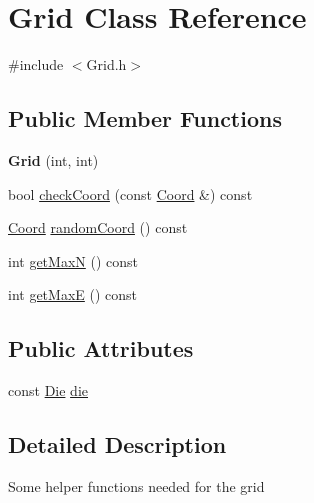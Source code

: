 \hypertarget{classGrid}{
\section{Grid Class Reference}
\label{classGrid}
}


{\ttfamily \#include $<$Grid.h$>$}

\subsection*{Public Member Functions}
\begin{DoxyCompactItemize}
\item 
\hypertarget{classGrid_a2a809d16ae2ba160bd3a0e7a8f6406df}{
{\bfseries Grid} (int, int)}
\label{classGrid_a2a809d16ae2ba160bd3a0e7a8f6406df}

\item 
bool \hyperlink{classGrid_ad5db3e871469f31a1a65154470bdc13a}{checkCoord} (const \hyperlink{classCoord}{Coord} \&) const 
\item 
\hyperlink{classCoord}{Coord} \hyperlink{classGrid_a9545221e40852a53eb5290060fefa5bd}{randomCoord} () const 
\item 
int \hyperlink{classGrid_afb8c15ffaa10076dcbd8877df1938e77}{getMaxN} () const 
\item 
int \hyperlink{classGrid_a7bd1b24c2f31794f04c4854a4d849fee}{getMaxE} () const 
\end{DoxyCompactItemize}
\subsection*{Public Attributes}
\begin{DoxyCompactItemize}
\item 
const \hyperlink{classDie}{Die} \hyperlink{classGrid_abd8ba23be391e599a69bd9892f4bc59a}{die}
\end{DoxyCompactItemize}


\subsection{Detailed Description}
Some helper functions needed for the grid 

